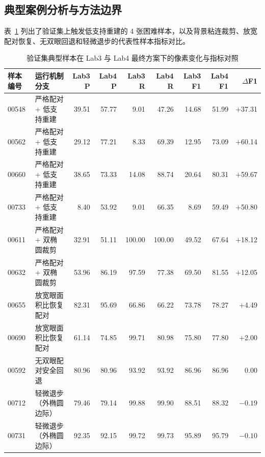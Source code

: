 \subsection{典型案例分析与方法边界}

表~\ref{tab:lab4_cases} 列出了验证集上触发低支持重建的 4 张困难样本，以及背景粘连裁剪、放宽配对恢复、无双眼回退和轻微退步的代表性样本指标对比。

\begin{table}[H]
\centering\small
\setlength{\tabcolsep}{3.5pt}
\caption{验证集典型样本在 Lab3 与 Lab4 最终方案下的像素变化与指标对照}\label{tab:lab4_cases}
\begin{tabular}{llrrrrrrr}
\toprule
样本编号 & 运行机制分支 & Lab3 P & Lab4 P & Lab3 R & Lab4 R & Lab3 F1 & Lab4 F1 & $\Delta$F1 \\
\midrule
00548 & 严格配对 + 低支持重建 & 39.51 & 57.77 & 9.01 & 47.26 & 14.68 & 51.99 & +37.31 \\
00562 & 严格配对 + 低支持重建 & 29.12 & 77.21 & 8.33 & 69.39 & 12.95 & 73.09 & +60.14 \\
00660 & 严格配对 + 低支持重建 & 38.65 & 73.33 & 14.08 & 88.74 & 20.64 & 80.31 & +59.67 \\
00733 & 严格配对 + 低支持重建 & 8.40 & 53.92 & 9.01 & 66.35 & 8.69 & 59.49 & +50.80 \\
00611 & 严格配对 + 双椭圆裁剪 & 32.91 & 51.11 & 100.00 & 100.00 & 49.52 & 67.64 & +18.12 \\
00632 & 严格配对 + 双椭圆裁剪 & 53.96 & 86.19 & 97.59 & 77.38 & 69.50 & 81.55 & +12.05 \\
00655 & 放宽眼面积比恢复配对 & 82.31 & 95.69 & 66.86 & 66.22 & 73.78 & 78.27 & +4.49 \\
00690 & 放宽眼面积比恢复配对 & 61.14 & 74.85 & 99.71 & 80.98 & 75.80 & 77.80 & +2.00 \\
00592 & 无双眼配对安全回退 & 80.96 & 80.96 & 93.92 & 93.92 & 86.96 & 86.96 & 0.00 \\
00712 & 轻微退步（外椭圆边际） & 79.46 & 79.14 & 99.88 & 99.90 & 88.51 & 88.32 & $-0.19$ \\
00731 & 轻微退步（外椭圆边际） & 92.35 & 92.15 & 99.72 & 99.73 & 95.89 & 95.79 & $-0.10$ \\
\bottomrule
\end{tabular}
\end{table}


